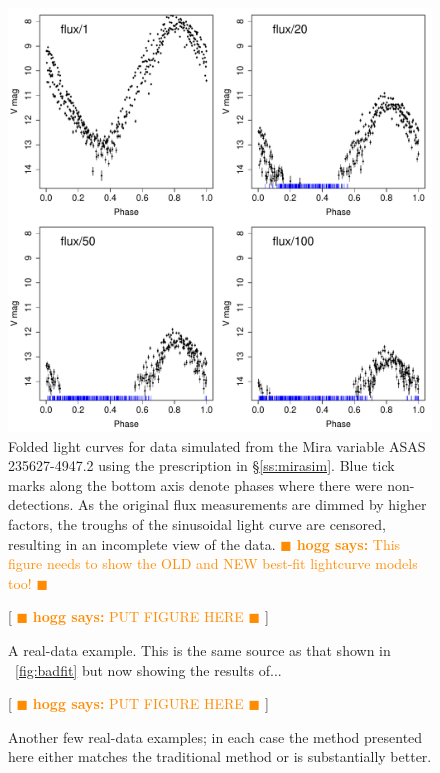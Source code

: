 \documentclass[12pt,preprint]{aastex}
\newcommand{\hogg}[1] { \textcolor{darkorange} {
\ensuremath{\blacksquare} {\bf hogg says:}  {#1}
\ensuremath{\blacksquare} } }
\begin{document}
\clearpage
\begin{figure}
\begin{center}
\includegraphics[angle=0,width=6.5in]{../plots/mira_simulated.pdf}
\end{center}
\caption{ Folded light curves for data simulated from the Mira variable ASAS 235627-4947.2 using the prescription in \S\ref{ss:mirasim}.  Blue tick marks along the bottom axis denote phases where there were non-detections.  As the original flux measurements are dimmed by higher factors, the troughs of the sinusoidal light curve are censored, resulting in an incomplete view of the data.  \hogg{This figure needs to show the OLD and NEW best-fit lightcurve models too!}\label{fig:mirasim}}
\end{figure}

\clearpage
\begin{figure}
  \begin{center}
    [\hogg{PUT FIGURE HERE}]
  \end{center}
  \caption{A real-data example.  This is the same source as that shown in \figurename~\ref{fig:badfit} but now showing the results of...\label{fig:goodfit}}
\end{figure}

\clearpage
\begin{figure}
  \begin{center}
    [\hogg{PUT FIGURE HERE}]
  \end{center}
  \caption{Another few real-data examples; in each case the method presented here either matches the traditional method or is substantially better.\label{fig:examples}}
\end{figure}
\end{document}
